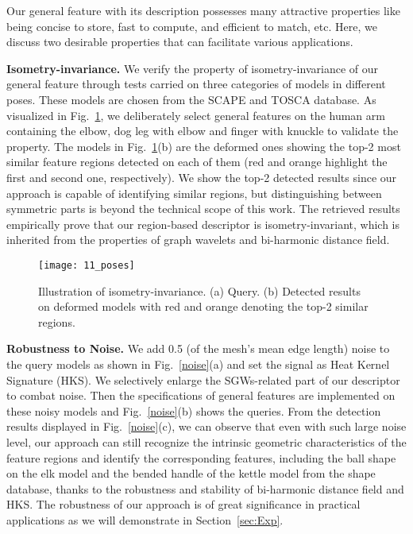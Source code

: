 Our general feature with its description possesses many attractive
properties like being concise to store, fast to compute, and efficient
to match, etc. Here, we discuss two desirable properties that can
facilitate various applications.

\textbf{Isometry-invariance.} We verify the property of
isometry-invariance of our general feature through tests carried on
three categories of models in different poses. These models are
chosen from the SCAPE and TOSCA database. As visualized in
Fig.~\ref{pose-human}, we deliberately select general features on the
human arm containing the elbow, dog leg with elbow and finger with
knuckle to validate the property. The models in
Fig.~\ref{pose-human}(b) are the deformed ones showing the top-2
most similar feature regions detected on each of them (red and orange
highlight the first and second one, respectively). We show the top-2
detected results since our approach is capable of identifying similar
regions, but distinguishing between symmetric parts is beyond the
technical scope of this work. The
retrieved results empirically prove that our region-based descriptor
is isometry-invariant, which is inherited from the
properties of graph wavelets and bi-harmonic distance field.

\begin{figure}[!to]
\texttt{[image: 11\_poses]}
\caption{Illustration of isometry-invariance. (a) Query. (b) Detected
  results on deformed models with red and orange denoting the top-2
  similar regions.}
\label{pose-human}
\end{figure}

\textbf{Robustness to Noise.} We add 0.5 (of the mesh's mean edge
length) noise to the query models as shown in Fig.~\ref{noise}(a) and
set the signal as Heat Kernel Signature (HKS).  We selectively enlarge
the SGWs-related part of our descriptor to combat noise.
Then the specifications of general features are
implemented on these noisy models and Fig.~\ref{noise}(b) shows the
queries. From the detection results displayed in
Fig.~\ref{noise}(c), we can observe that even with such large noise
level, our approach can still recognize the intrinsic geometric
characteristics of the feature regions and identify the corresponding
features, including the ball shape on the elk model and the bended
handle of the kettle model from the shape database, thanks to the
robustness and stability of bi-harmonic distance field and HKS. The
robustness of our approach is of great significance in practical
applications as we will demonstrate in Section~\ref{sec:Exp}.

